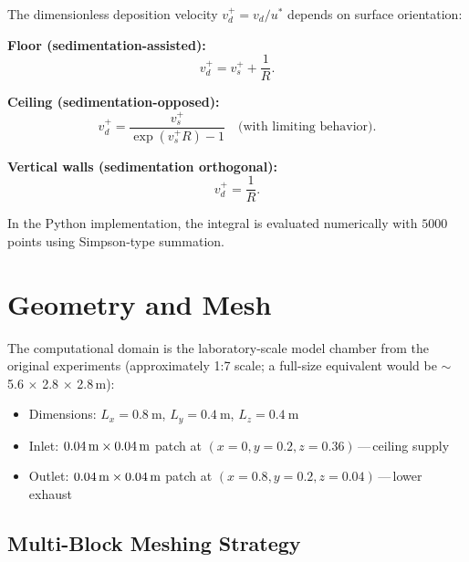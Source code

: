\documentclass[12pt]{article}
\begin{document}
The dimensionless deposition velocity $v_d^+ = v_d / u^*$ depends on surface orientation:

\textbf{Floor (sedimentation-assisted):}
\begin{equation}
    v_d^+ = v_s^+ + \frac{1}{R}. \label{eq:vd_floor}
\end{equation}

\textbf{Ceiling (sedimentation-opposed):}
\begin{equation}
    v_d^+ = \frac{v_s^+}{\exp(v_s^+ R) - 1} \quad \text{(with limiting behavior)}. \label{eq:vd_ceiling}
\end{equation}

\textbf{Vertical walls (sedimentation orthogonal):}
\begin{equation}
    v_d^+ = \frac{1}{R}. \label{eq:vd_vertical}
\end{equation}

In the Python implementation, the integral is evaluated numerically with $5000$ points using Simpson-type summation.

\section{Geometry and Mesh}

The computational domain is the laboratory-scale model chamber from the original experiments (approximately 1:7 scale; a full-size equivalent would be $\sim$5.6 $\times$ 2.8 $\times$ 2.8\,m):
\begin{itemize}
    \item Dimensions: $L_x = \SI{0.8}{\meter}$, $L_y = \SI{0.4}{\meter}$, $L_z = \SI{0.4}{\meter}$
    \item Inlet: $0.04\,{\rm m} \times 0.04\,{\rm m}$ patch at $(x=0, y=0.2, z=0.36)$\,---\,ceiling supply
    \item Outlet: $0.04\,{\rm m} \times 0.04\,{\rm m}$ patch at $(x=0.8, y=0.2, z=0.04)$\,---\,lower exhaust
\end{itemize}

\subsection{Multi-Block Meshing Strategy}
\end{document}
